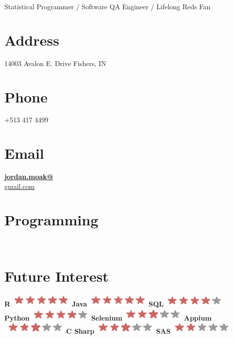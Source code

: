 \documentclass[]{moak-resume}
\begin{document}
      {Statistical Programmer / Software QA Engineer / Lifelong Reds Fan}
      

\begin{aside}
  \section{Address}
    14003 Avalon E. Drive
    Fishers, IN
    ~
  \section{Phone}
    +513 417 4499
    ~
  \section{Email}
    \href{mailto:jordan.moak@gmail.com}{\textbf{jordan.moak@}\\gmail.com}
    ~
  \section{Programming}
	\programmingPie{}
    ~
  \section{Future Interest}
    \textbf{R}\includegraphics[scale=0.40]{img/5stars.png}
    \textbf{Java}\includegraphics[scale=0.40]{img/5stars.png}
    \textbf{SQL}\includegraphics[scale=0.40]{img/4stars.png}
    \textbf{Python}\includegraphics[scale=0.40]{img/4stars.png}
    \textbf{Selenium}\includegraphics[scale=0.40]{img/3stars.png}
    \textbf{Appium}\includegraphics[scale=0.40]{img/3stars.png}
    \textbf{C Sharp}\includegraphics[scale=0.40]{img/3stars.png}
    \textbf{SAS}\includegraphics[scale=0.40]{img/2stars.png}
    ~

\end{aside}
\end{document}
